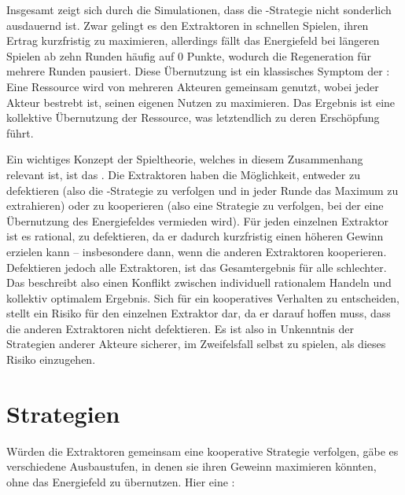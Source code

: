 Insgesamt zeigt sich durch die Simulationen, dass die -Strategie nicht sonderlich ausdauernd ist. Zwar gelingt es den Extraktoren in schnellen Spielen, ihren Ertrag kurzfristig zu maximieren, allerdings fällt das Energiefeld bei längeren Spielen ab zehn Runden häufig auf 0 Punkte, wodurch die Regeneration für mehrere Runden pausiert. Diese Übernutzung ist ein klassisches Symptom der  \cite[S. 47]{004_KII12_distributed-artificial-intelligence-and-machine-learning}: Eine Ressource wird von mehreren Akteuren gemeinsam genutzt, wobei jeder Akteur bestrebt ist, seinen eigenen Nutzen zu maximieren. Das Ergebnis ist eine kollektive Übernutzung der Ressource, was letztendlich zu deren Erschöpfung führt.

Ein wichtiges Konzept der Spieltheorie, welches in diesem Zusammenhang relevant ist, ist das  \cite[S. 46]{004_KII12_distributed-artificial-intelligence-and-machine-learning}. Die Extraktoren haben die Möglichkeit, entweder zu defektieren (also die -Strategie zu verfolgen und in jeder Runde das Maximum zu extrahieren) oder zu kooperieren (also eine Strategie zu verfolgen, bei der eine Übernutzung des Energiefeldes vermieden wird). Für jeden einzelnen Extraktor ist es rational, zu defektieren, da er dadurch kurzfristig einen höheren Gewinn erzielen kann -- insbesondere dann, wenn die anderen Extraktoren kooperieren. Defektieren jedoch alle Extraktoren, ist das Gesamtergebnis für alle schlechter. Das  beschreibt also einen Konflikt zwischen individuell rationalem Handeln und kollektiv optimalem Ergebnis. Sich für ein kooperatives Verhalten zu entscheiden, stellt ein Risiko für den einzelnen Extraktor dar, da er darauf hoffen muss, dass die anderen Extraktoren nicht defektieren. Es ist also in Unkenntnis der Strategien anderer Akteure sicherer, im Zweifelsfall selbst  zu spielen, als dieses Risiko einzugehen.

\section{ Strategien}
\label{sec:02-03_welfare-strategies}

Würden die Extraktoren gemeinsam eine kooperative Strategie verfolgen, gäbe es verschiedene Ausbaustufen, in denen sie ihren Geweinn maximieren könnten, ohne das Energiefeld zu übernutzen. Hier eine :

